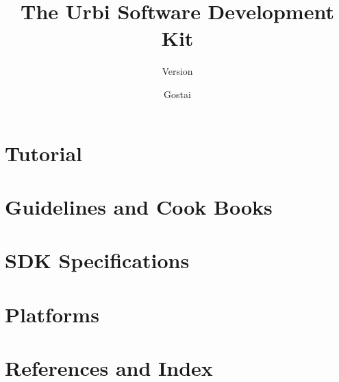 \documentclass[openright,twoside,11pt]{book}
\title{The Urbi Software Development Kit}
\subtitle{Version \VcsDescription}
\author{Gostai}
\begin{document}
\maketitle



\tableofcontents

\part{\us Tutorial}
\label{part:tut}




\part{Guidelines and Cook Books}
\label{part:guide}




\part{\urbi SDK Specifications}
\label{part:specs}


\part{\urbi Platforms}
\label{part:platforms}


\part{References and Index}
\label{part:ref}


\chapterIndex
\end{document}
